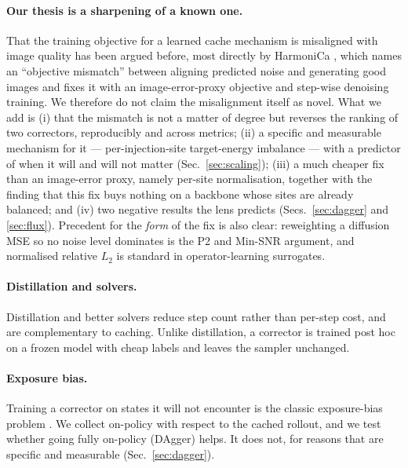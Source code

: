 \documentclass[10pt,twocolumn,letterpaper]{article}
\begin{document}
\paragraph{Our thesis is a sharpening of a known one.} That the training objective for
a learned cache mechanism is misaligned with image quality has been argued before, most
directly by HarmoniCa \cite{huang2025harmonica}, which names an ``objective mismatch''
between aligning predicted noise and generating good images and fixes it with an
image-error-proxy objective and step-wise denoising training. We therefore do not claim
the misalignment itself as novel. What we add is (i) that the mismatch is not a matter
of degree but reverses the ranking of two correctors, reproducibly and across metrics;
(ii) a specific and measurable mechanism for it --- per-injection-site target-energy
imbalance --- with a predictor of when it will and will not matter
(Sec.~\ref{sec:scaling}); (iii) a much cheaper fix than an image-error proxy, namely
per-site normalisation, together with the finding that this fix buys nothing on a
backbone whose sites are already balanced; and (iv) two negative results the lens
predicts (Secs.~\ref{sec:dagger} and \ref{sec:flux}). Precedent for the \emph{form} of
the fix is also clear: reweighting a diffusion MSE so no noise level dominates is the
P2 \cite{choi2022p2} and Min-SNR \cite{hang2023minsnr} argument, and normalised
relative $L_2$ is standard in operator-learning surrogates.

\paragraph{Distillation and solvers.} Distillation
\cite{salimans2022progressive,song2023consistency} and better solvers
\cite{lu2022dpmsolver} reduce step count rather than per-step cost, and are
complementary to caching. Unlike distillation, a corrector is trained post hoc on a
frozen model with cheap labels and leaves the sampler unchanged.

\paragraph{Exposure bias.} Training a corrector on states it will not encounter is
the classic exposure-bias problem \cite{bengio2015scheduled,ross2011dagger}. We
collect on-policy with respect to the cached rollout, and we test whether going
fully on-policy (DAgger) helps. It does not, for reasons that are specific and
measurable (Sec.~\ref{sec:dagger}).
\end{document}
